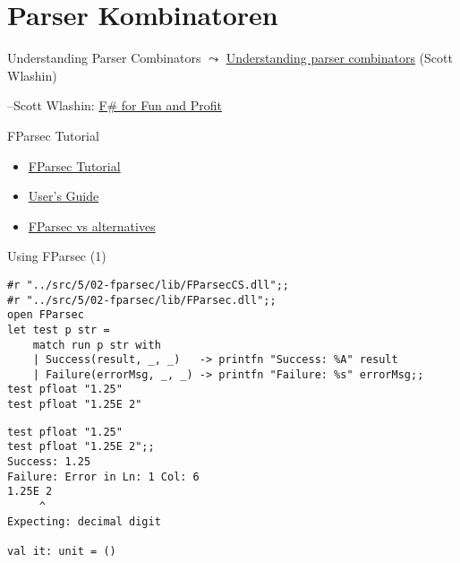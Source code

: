 \documentclass[t]{beamer}
\begin{document}
\section{Parser Kombinatoren }
\label{sec:orgcd35902}
\begin{frame}[label={sec:orgb49b178}]{Understanding Parser Combinators}
\(\leadsto\) \href{./5 Understanding parser combinators.pdf}{Understanding parser combinators} (Scott Wlashin)

\null\hfill--Scott Wlashin: \href{https://fsharpforfunandprofit.com/parser}{F\# for Fun and Profit}
\end{frame}

\begin{frame}[label={sec:org7a79f22}]{FParsec Tutorial}
\begin{itemize}
\item \href{http://www.quanttec.com/fparsec/tutorial.html\#}{FParsec Tutorial}
\item \href{http://www.quanttec.com/fparsec/users-guide/}{User’s Guide}
\item \href{http://www.quanttec.com/fparsec/about/fparsec-vs-alternatives.html}{FParsec vs alternatives}
\end{itemize}
\end{frame}

\begin{frame}[label={sec:org9c3497d},fragile]{Using FParsec (1)}
 \begin{verbatim}
#r "../src/5/02-fparsec/lib/FParsecCS.dll";; 
#r "../src/5/02-fparsec/lib/FParsec.dll";;
open FParsec
let test p str =
    match run p str with
    | Success(result, _, _)   -> printfn "Success: %A" result
    | Failure(errorMsg, _, _) -> printfn "Failure: %s" errorMsg;;
test pfloat "1.25"
test pfloat "1.25E 2"
\end{verbatim}

\begin{verbatim}
test pfloat "1.25"
test pfloat "1.25E 2";;
Success: 1.25                           
Failure: Error in Ln: 1 Col: 6
1.25E 2
     ^
Expecting: decimal digit

val it: unit = ()
\end{verbatim}
\end{frame}
\end{document}
